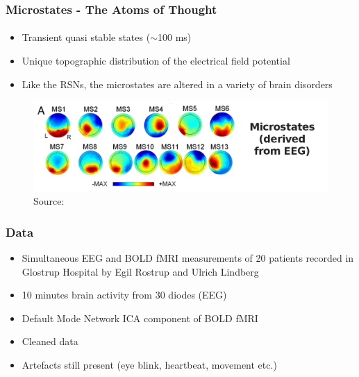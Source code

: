 \documentclass[9pt,presentation]{beamer}   %
\begin{document}
\begin{frame}[t]
\frametitle{Microstates - The Atoms of Thought}
\framesubtitle{\cite{lehmann1980reference}}

\vspace{0.3cm}
\begin{itemize}
\item Transient quasi stable states ($\sim$100 ms)
\vspace{0.3cm}
\item Unique topographic distribution of the electrical field potential
\vspace{0.3cm}
\item Like the RSNs, the microstates are altered in a variety of brain disorders
\end{itemize}

\begin{figure}[H]
\begin{center}
\includegraphics[scale=0.2]{microstates}
\caption{Source: \cite{Yuan20122062}}
\end{center}
\end{figure}

\end{frame}



\begin{frame}[t]
\frametitle{Data}

\vspace{0.3cm}
\begin{itemize}
\item Simultaneous EEG and BOLD fMRI measurements of 20 patients recorded in Glostrup Hospital by Egil Rostrup and Ulrich Lindberg
\vspace{0.3cm}
\item 10 minutes brain activity from 30 diodes (EEG)
\vspace{0.3cm}
\item Default Mode Network ICA component of BOLD fMRI
\vspace{0.3cm}
\item Cleaned data
\vspace{0.3cm}
\item Artefacts still present (eye blink, heartbeat, movement etc.)
\end{itemize}

\end{frame}
\end{document}
